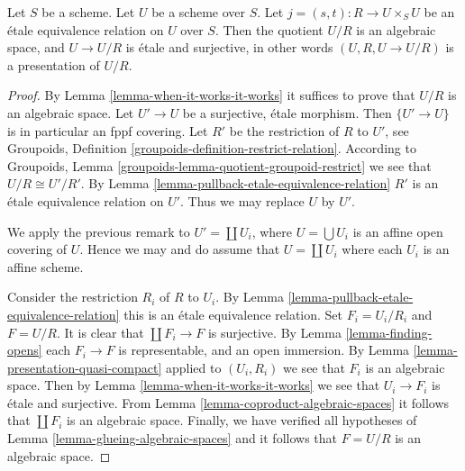 \begin{theorem}
\label{theorem-presentation}
Let $S$ be a scheme. Let $U$ be a scheme over $S$.
Let $j = (s, t) : R \to U \times_S U$
be an \'etale equivalence relation on $U$ over $S$.
Then the quotient $U/R$ is an algebraic space,
and $U \to U/R$ is \'etale and surjective, in other words
$(U, R, U \to U/R)$ is a presentation of $U/R$.
\end{theorem}

\begin{proof}
By Lemma \ref{lemma-when-it-works-it-works}
it suffices to prove that $U/R$ is an algebraic space.
Let $U' \to U$ be a surjective, \'etale morphism.
Then $\{U' \to U\}$ is in particular an fppf covering.
Let $R'$ be the restriction of $R$ to $U'$, see
Groupoids, Definition \ref{groupoids-definition-restrict-relation}.
According to
Groupoids, Lemma \ref{groupoids-lemma-quotient-groupoid-restrict}
we see that $U/R \cong U'/R'$.
By Lemma \ref{lemma-pullback-etale-equivalence-relation} $R'$ is an
\'etale equivalence relation on $U'$. Thus we may replace $U$ by $U'$.

\medskip\noindent
We apply the previous remark to $U' = \coprod U_i$, where
$U = \bigcup U_i$ is an affine open covering of $U$. Hence we
may and do assume that $U = \coprod U_i$ where
each $U_i$ is an affine scheme.

\medskip\noindent
Consider the restriction $R_i$ of $R$ to $U_i$.
By Lemma \ref{lemma-pullback-etale-equivalence-relation}
this is an \'etale equivalence relation.
Set $F_i = U_i/R_i$ and $F = U/R$.
It is clear that $\coprod F_i \to F$ is surjective.
By Lemma \ref{lemma-finding-opens} each $F_i \to F$
is representable, and an open immersion.
By Lemma \ref{lemma-presentation-quasi-compact}
applied to $(U_i, R_i)$ we see that $F_i$ is an algebraic space.
Then by Lemma \ref{lemma-when-it-works-it-works} we see that
$U_i \to F_i$ is \'etale and surjective.
From Lemma \ref{lemma-coproduct-algebraic-spaces}
it follows that $\coprod F_i$ is an algebraic space.
Finally, we have verified all
hypotheses of Lemma \ref{lemma-glueing-algebraic-spaces}
and it follows that $F = U/R$ is an algebraic space.
\end{proof}

